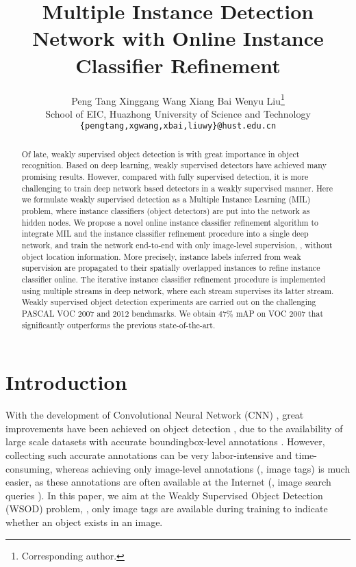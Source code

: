 \documentclass[10pt,twocolumn,letterpaper]{article}
\begin{document}
\title{Multiple Instance Detection Network with Online Instance Classifier Refinement}

\author{Peng Tang
\quad
Xinggang Wang
\quad
Xiang Bai
\quad
Wenyu Liu\thanks{Corresponding author.}\\
School of EIC, Huazhong University of Science and Technology\\
{\tt\small \{pengtang,xgwang,xbai,liuwy\}@hust.edu.cn}
}

\maketitle


\begin{abstract}
   Of late, weakly supervised object detection is with great importance in object recognition.
   Based on deep learning, weakly supervised detectors have achieved many promising results.
   However, compared with fully supervised detection, it is more challenging to train deep network based detectors in a weakly supervised manner.
   Here we formulate weakly supervised detection as a Multiple Instance Learning (MIL) problem, where instance classifiers (object detectors) are put into the network as hidden nodes.
   We propose a novel online instance classifier refinement algorithm to integrate MIL and the instance classifier refinement procedure into a single deep network, and train the network end-to-end with only image-level supervision, \ie, without object location information.
   More precisely, instance labels inferred from weak supervision are propagated to their spatially overlapped instances to refine instance classifier online.
   The iterative instance classifier refinement procedure is implemented using multiple streams in deep network, where each stream supervises its latter stream.
   Weakly supervised object detection experiments are carried out on the challenging PASCAL VOC 2007 and 2012 benchmarks.
   We obtain $47\%$ mAP on VOC 2007 that significantly outperforms the previous state-of-the-art.
\end{abstract}



\section{Introduction}
\label{sec:intro}

With the development of Convolutional Neural Network (CNN) \cite{Ref:Krizhevsky2012,Ref:Lecun1998}, great improvements have been achieved on object detection \cite{Ref:Girshick2015,Ref:Girshick2016,Ref:Liu2016,Ref:Redmon2016,Ref:Ren2015}, due to the availability of large scale datasets with accurate boundingbox-level annotations \cite{Ref:Deng2009,Ref:Everingham2010,Ref:Lin2014}.
However, collecting such accurate annotations can be very labor-intensive and time-consuming, whereas achieving only image-level annotations (\ie, image tags) is much easier, as these annotations are often available at the Internet (\eg, image search queries \cite{Ref:Li2013}).
In this paper, we aim at the Weakly Supervised Object Detection (WSOD) problem, \ie, only image tags are available during training to indicate whether an object exists in an image.
\end{document}
